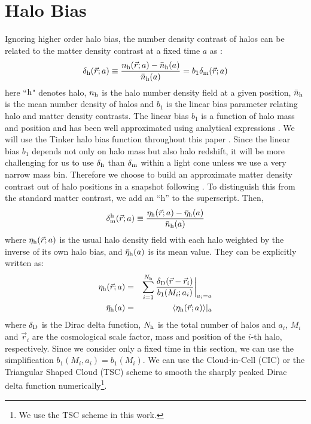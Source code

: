 \documentclass[prd,amsmath,amssymb,floatfix,superscriptaddress,nofootinbib,twocolumn]{revtex4-1}
\def\be{\begin{equation}}
\def\ee{\end{equation}}
\def\bea{\begin{eqnarray}}
\def\eea{\end{eqnarray}}
\newcommand{\vrr}{\vec{r}}
\newcommand{\eql}[1]{\label{eq:#1}}
\newcommand\dmh{\delta_{\rm m}^{\rm h}}
\begin{document}
\section{Halo Bias} \label{sec2}
Ignoring higher order halo bias, the number density contrast of halos can be related to the matter density contrast at a fixed time $a$ as \cite{Desjacques:2018rev}:
\be 
\delta_{\rm h}(\vrr;a) \equiv \frac{n_{\rm h}(\vrr;a)-\bar{n}_{\rm h}(a)}{\bar{n}_{\rm h}(a)}=b_{1}\delta_{\rm m}(\vrr;a) \eql{hdc}
\ee 
here ``$\rm h$" denotes halo, $n_{\rm h}$ is the halo number density field at a given position, $\bar{n}_{\rm h}$ is the mean number density of halos and $b_{1}$ is the linear bias parameter relating halo and matter density contrasts. The linear bias $b_{1}$ is a function of halo mass and position and has been well approximated using analytical expressions \cite{Seljak:2004SW}\cite{Bhattacharya:2011MF}. We will use the Tinker halo bias function throughout this paper \cite{Tinker:2010Tinker}. Since the linear bias $b_1$ depends not only on halo mass but also halo redshift, it will be more challenging for us to use $\delta_{\rm h}$ than $\delta_{\rm m}$ within a light cone unless we use a very narrow mass bin. Therefore we choose to build an approximate matter density contrast out of halo positions in a snapshot following \cite{Pervical:2007GPS}. To distinguish this from the standard matter contrast, we add an ``h'' to the superscript. Then,
\be 
\dmh(\vrr;a) \equiv \frac{\eta_{\rm h}(\vrr;a)-\bar{\eta}_{\rm h}(a)}{\bar{n}_{\rm h}(a)} \eql{hm}
\ee 
where $\eta_{\rm h}(\vrr;a)$ is the usual halo density field with each halo weighted by the inverse of its own halo bias, and $\bar{\eta}_{\rm h}(a)$ is its mean value. They can be explicitly written as:
\bea
\eta_{\rm h}(\vrr;a)&=&\sum_{i=1}^{N_{\rm h}}\frac{\delta_{\rm D}(\vrr-\vrr_{i})}{b_{1}(M_{i};a_{i})}\bigg|_{a_{i}=a} \eql{wnob}\\
\bar{\eta}_{\rm h}(a)&=&\langle \eta_{\rm h}(\vrr;a)\rangle|_{a} \eql{nob}
\eea
where $\delta_{\rm D}$ is the Dirac delta function, $N_{\rm h}$ is the total number of halos and $a_{i}$, $M_{i}$ and $\vrr_{i}$ are the cosmological scale factor, mass and position of the $i$-th halo, respectively. Since we consider only a fixed time in this section, we can use the simplification $b_{1}(M_{i},a_{i})=b_{1}(M_i)$. We can use the Cloud-in-Cell (CIC) or the Triangular Shaped Cloud (TSC) scheme \cite{Sefusatti:2015CIC} to smooth the sharply peaked Dirac delta function numerically\footnote{We use the TSC scheme in this work.}.
\end{document}
